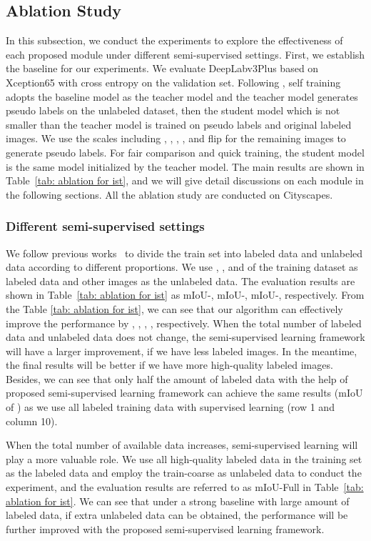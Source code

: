 \documentclass[10pt,twocolumn,letterpaper]{article}
\begin{document}
{\subsection{Ablation Study}
In this subsection, we conduct the experiments to explore the effectiveness of each proposed module under different semi-supervised settings. First, we establish the baseline for our experiments. We evaluate DeepLabv3Plus based on Xception65 with cross entropy on the validation set. Following \cite{chen2005naive, xie2020self}, self training adopts the baseline model as the teacher model and the teacher model generates pseudo labels on the unlabeled dataset, then the student model which is not smaller than the teacher model is trained on pseudo labels and original labeled images. We use the scales including , , , ,   and flip for the remaining images to generate pseudo labels. For fair comparison and quick training, the student model is the same model initialized by the teacher model. The main results are shown in Table~\ref{tab: ablation for ist}, and we will give detail discussions on each module in the following sections. All the ablation study are conducted on Cityscapes.

\subsubsection{Different semi-supervised settings}

We follow previous works~\cite{french2019semi,souly2017semi,hung2018adversarial} to divide the train set into labeled data and unlabeled data according to different proportions. We 
use
,
,
and 
of the training dataset as labeled data and other images as the unlabeled data. The evaluation results are shown in Table~\ref{tab: ablation for ist} as 
mIoU-, mIoU-, mIoU-, respectively. From the Table \ref{tab: ablation for ist}, we can see that our algorithm can effectively improve the performance by , , , , respectively. 
When the total number of labeled data and unlabeled data does not change, the semi-supervised learning framework will have a larger improvement, if we have less labeled images. In the meantime, the final results will be better if we have more high-quality labeled images. Besides, we can see that only half the amount of labeled data with the help of proposed semi-supervised learning framework can achieve the same results (mIoU of ) as we use all labeled training data with supervised learning (row 1 and column 10).

When the total number of available data increases, semi-supervised learning will play a more valuable role. We  use all high-quality labeled data in the training set as the labeled data and employ the train-coarse as unlabeled data to conduct the experiment, and the evaluation results are referred to as mIoU-Full in Table~\ref{tab: ablation for ist}. We can see that under a strong baseline with large amount of labeled data, if extra unlabeled data can be obtained, the performance will be further improved with the proposed semi-supervised learning framework.

}
\end{document}
